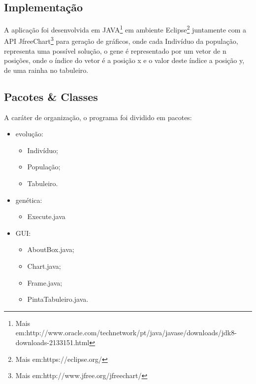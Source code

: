 \documentclass[12pt,a4paper]{article}
\begin{document}
\subsection{Implementação}

\hspace{4ex}A aplicação foi desenvolvida em JAVA\footnote{Mais em:http://www.oracle.com/technetwork/pt/java/javase/downloads/jdk8-downloads-2133151.html} em ambiente Eclipse\footnote{Mais em:https://eclipse.org/} juntamente com a API JfreeChart\footnote{Mais em:http://www.jfree.org/jfreechart/} para geração de gráficos, onde cada Indivíduo da população, representa uma possível solução, o gene é representado por um vetor de n posições, onde o índice do vetor é a posição x e o valor deste índice a posição y, de uma rainha no tabuleiro.

\newpage
\thispagestyle{main}

\subsection{Pacotes \& Classes}

A caráter de organização, o programa foi dividido em pacotes:

\begin{itemize}
\item evolução:
	\begin{itemize}
	\item Indivíduo;
	\item População;
	\item Tabuleiro. 
	\end{itemize}
\item genética:
	\begin{itemize}
	\item Execute.java
	\end{itemize}
\item GUI:
	\begin{itemize}
	\item AboutBox.java;
	\item Chart.java;
	\item Frame.java;
	\item PintaTabuleiro.java.
	\end{itemize}
\end{itemize}
\end{document}
